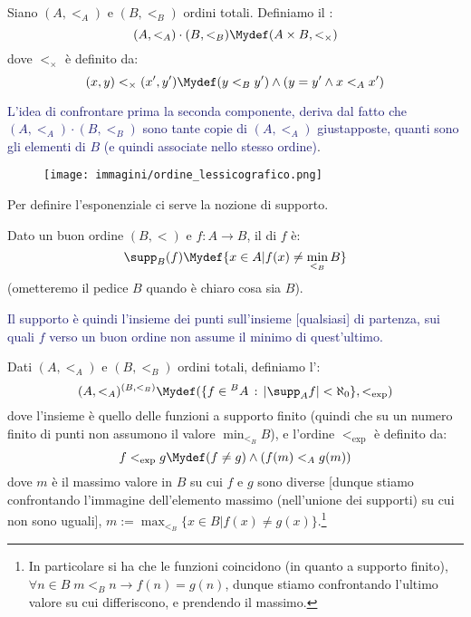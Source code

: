 \documentclass[11pt]{scrartcl}
\begin{document}
\begin{definition}
	Siano $(A,<_A)$ e $(B,<_B)$ ordini totali. Definiamo il :
	\[ (A,<_A) \cdot (B,<_B) \Mydef (A \times B, <_\times)
		\]
	dove $<_\times$ è definito da:
	\[ (x,y) <_\times (x',y') \Mydef (y <_B y') \land (y = y' \land x <_A x')
		\]
\end{definition}

\textcolor{MidnightBlue}{L'idea di confrontare prima la seconda componente, deriva dal fatto che $(A,<_A) \cdot (B,<_B)$ sono 
tante copie di $(A,<_A)$ giustapposte, quanti sono gli elementi di $B$ (e quindi associate nello stesso ordine)}.

\begin{figure}[H]
	\centering
	\texttt{[image: immagini/ordine\_lessicografico.png]}
\end{figure}

Per definire l'esponenziale ci serve la nozione di supporto.

\begin{definition}
	Dato un buon ordine $(B,<)$ e $f : A \rightarrow B$, il  di $f$ è:
	\[ \supp_B(f) \Mydef \{x \in A | f(x) \ne \min_{<_B} B\}
		\]
	(ometteremo il pedice $B$ quando è chiaro cosa sia $B$).
\end{definition}

\textcolor{MidnightBlue}{Il supporto è quindi l'insieme dei punti sull'insieme [qualsiasi] di partenza, sui quali $f$ verso un buon ordine non assume il minimo di quest'ultimo.}

\begin{definition}
	Dati $(A,<_A)$ e $(B,<_B)$ ordini totali, definiamo l':
	\[ (A,<_A)^{(B,<_B)} \Mydef (\{f \in {}^{B}A \, : \, |\supp_A f| < \aleph_0\},<_{\exp})
		\]
	dove l'insieme è quello delle funzioni a supporto finito (quindi che su un numero finito di punti non assumono il valore $\min_{<_B}B$), e l'ordine $<_{\exp}$ è definito da:
	\[ f <_{\exp} g \Mydef (f \ne g) \land (f(m) <_A g(m))
		 \]
	dove $m$ è il massimo valore in $B$ su cui $f$ e $g$ sono diverse [dunque stiamo confrontando l'immagine dell'elemento massimo (nell'unione dei supporti) su cui non sono uguali], $m := \max_{<_B}\{x \in B | f(x) \ne g(x)\}$.\footnote{In particolare si ha che le funzioni coincidono (in quanto a supporto finito),
	$\forall n \in B \; m <_B n \rightarrow f(n) = g(n)$, dunque stiamo confrontando l'ultimo valore su cui differiscono, e prendendo il massimo.}
\end{definition}
\end{document}

